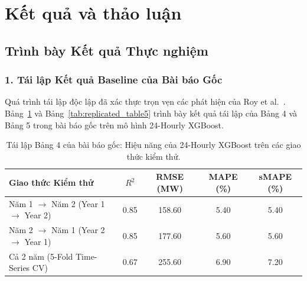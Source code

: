 \section{Kết quả và thảo luận}
\label{sec:results_and_discussion}

\subsection{Trình bày Kết quả Thực nghiệm}

\subsubsection{1. Tái lập Kết quả Baseline của Bài báo Gốc}
Quá trình tái lập độc lập đã xác thực trọn vẹn các phát hiện của Roy et al.~\cite{roy2025hourly}. Bảng~\ref{tab:replicated_table4} và Bảng~\ref{tab:replicated_table5} trình bày kết quả tái lập của Bảng 4 và Bảng 5 trong bài báo gốc trên mô hình 24-Hourly XGBoost.

\begin{table}[htbp]
    \centering
    \small
    \caption{Tái lập Bảng 4 của bài báo gốc: Hiệu năng của 24-Hourly XGBoost trên các giao thức kiểm thử.}
    \label{tab:replicated_table4}
    \begin{tabular}{lcccc}
        \toprule
        \textbf{Giao thức Kiểm thử} & \textbf{$R^2$} & \textbf{RMSE (MW)} & \textbf{MAPE (\%)} & \textbf{sMAPE (\%)} \\
        \midrule
        Năm 1 $\to$ Năm 2 (Year 1 $\to$ Year 2) & 0.85 & 158.60 & 5.40 & 5.40 \\
        Năm 2 $\to$ Năm 1 (Year 2 $\to$ Year 1) & 0.85 & 177.60 & 5.60 & 5.60 \\
        Cả 2 năm (5-Fold Time-Series CV) & 0.67 & 255.60 & 6.90 & 7.20 \\
        \bottomrule
    \end{tabular}
\end{table}

